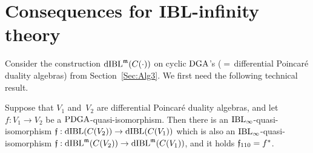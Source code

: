 \documentclass[\MainFolder/Text.tex]{subfiles}
\begin{document}
\section{Consequences for IBL-infinity theory}\label{Section:FuncIBL}

Consider the construction $\mathrm{dIBL}^{\mathfrak{m}}(C(\cdot))$ on cyclic $\mathrm{DGA}$'s ($=$\,differential Poincar\'e duality algebras) from Section~\ref{Sec:Alg3}. We first need the following technical result.

\begin{Proposition}\label{Prop:Functorialityo}
Suppose that $V_1$ and~$V_2$ are differential Poincar\'e duality algebras, and let $f: V_1 \rightarrow V_2$ be a $\mathrm{PDGA}$-quasi-isomorphism.
Then there is an $\mathrm{IBL}_\infty$-quasi-isomorphism $\mathfrak{f}: \mathrm{dIBL}(C(V_2)) \rightarrow \mathrm{dIBL}(C(V_1))$ which is also an $\mathrm{IBL}_\infty$-quasi-isomorphism $\mathfrak{f}: \mathrm{dIBL}^{\mathfrak{m}}(C(V_2)) \rightarrow \mathrm{dIBL}^{\mathfrak{m}}(C(V_1))$, and it holds $\mathfrak{f}_{110} = f^*$. 
\end{Proposition}
\end{document}
